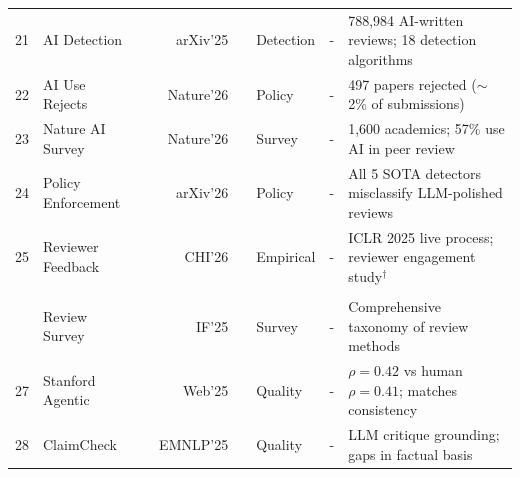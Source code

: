 \documentclass{llmxive}
\begin{document}
\begin{table}[!ht]
{\begin{tabular}{c| >{\centering\arraybackslash}p{3cm} r r |c| >{\centering\arraybackslash}p{2.1cm} |c| p{7.8cm}}
{21} & AI Detection & \cite{aidetectionreview2025} & {\small arXiv'25} & \href{https://arxiv.org/abs/2502.19614}{} & Detection        & -                                                                     & 788,984 AI-written reviews; 18 detection algorithms \\
{22} & AI Use Rejects & \cite{aiuserejects2026} & {\small Nature'26} & \href{https://www.nature.com/articles/d41586-026-00893-2}{} & Policy           & -                                                                     & 497 papers rejected ($\sim$2\% of submissions) \\
{23} & Nature AI Survey & \cite{aireviewsurvey2025} & {\small Nature'26} & \href{https://www.nature.com/articles/d41586-025-04066-5}{} & Survey           & -                                                                     & 1,600 academics; 57\% use AI in peer review \\
{24} & Policy Enforcement & \cite{reviewpolicyenforce2026} & {\small arXiv'26} & \href{https://arxiv.org/abs/2603.20450}{} & Policy          & -                                                                     & All 5 SOTA detectors misclassify LLM-polished reviews \\
{25} & Reviewer Feedback & \cite{reviewerfeedback2026} & {\small CHI'26} & \href{https://doi.org/10.1145/3772318.3791431}{} & Empirical        & -                                                                     & ICLR 2025 live process; reviewer engagement study$^\dagger$ \\
\addlinespace[3pt]
\multicolumn{8}{@{}l}{\cellcolor{S6color!65}\textbf{\textsf{~~Review Consistency and Bias Assessment}}} \\
\addlinespace[1pt]
{26} & Review Survey & \cite{zhuang2025asprsurvey} & {\small IF'25} & \href{https://www.sciencedirect.com/science/article/pii/S1566253525004051}{} & Survey     & -                                                                     & Comprehensive taxonomy of review methods \\
{27} & Stanford Agentic & \cite{stanfordreviewer2025} & {\small Web'25} & \href{https://paperreview.ai/tech-overview}{} & Quality          & -                                                                     & $\rho=0.42$ vs human $\rho=0.41$; matches consistency \\
{28} & ClaimCheck & \cite{claimcheck2025} & {\small EMNLP'25} & \href{https://aclanthology.org/2025.findings-emnlp.1185/}{} & Quality          & -                                                                     & LLM critique grounding; gaps in factual basis \\

\end{tabular}}
\end{table}
\end{document}

